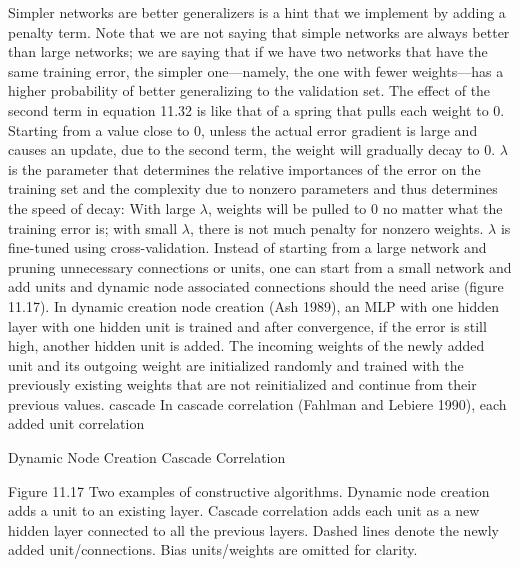 Simpler networks are better generalizers is a hint that we implement by adding a penalty term. Note that we are not saying that simple networks are always better than large networks; we are saying that if we have two networks that have the same training error, the simpler one---namely, the one with fewer weights---has a higher probability of better generalizing to the validation set. The effect of the second term in equation 11.32 is like that of a spring that pulls each weight to 0. Starting from a value close to 0, unless the actual error gradient is large and causes an update, due to the second term, the weight will gradually decay to 0. $\lambda$ is the parameter that determines the relative importances of the error on the training set and the complexity due to nonzero parameters and thus determines the speed of decay: With large $\lambda$, weights will be pulled to 0 no matter what the training error is; with small $\lambda$, there is not much penalty for nonzero weights. $\lambda$ is fine-tuned using cross-validation. Instead of starting from a large network and pruning unnecessary connections or units, one can start from a small network and add units and dynamic node associated connections should the need arise (figure 11.17). In dynamic creation node creation (Ash 1989), an MLP with one hidden layer with one hidden unit is trained and after convergence, if the error is still high, another hidden unit is added. The incoming weights of the newly added unit and its outgoing weight are initialized randomly and trained with the previously existing weights that are not reinitialized and continue from their previous values. cascade In cascade correlation (Fahlman and Lebiere 1990), each added unit correlation

Dynamic Node Creation Cascade Correlation

Figure 11.17 Two examples of constructive algorithms. Dynamic node creation adds a unit to an existing layer. Cascade correlation adds each unit as a new hidden layer connected to all the previous layers. Dashed lines denote the newly added unit/connections. Bias units/weights are omitted for clarity.

